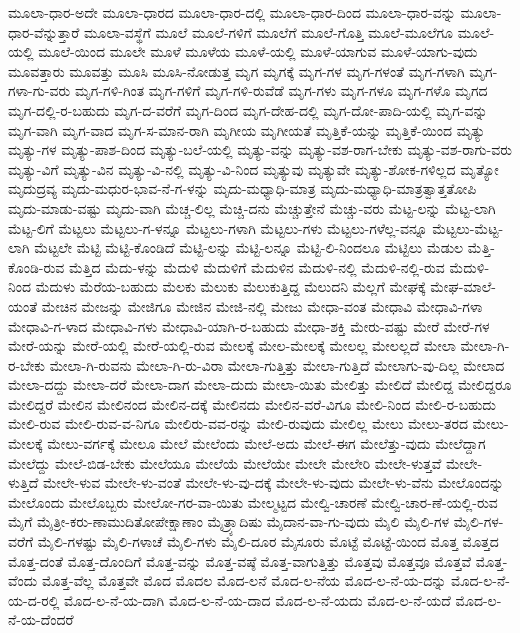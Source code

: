 {ಮೂಲಾ-ಧಾರ-ಅದೇ
ಮೂಲಾ-ಧಾರದ
ಮೂಲಾ-ಧಾರ-ದಲ್ಲಿ
ಮೂಲಾ-ಧಾರ-ದಿಂದ
ಮೂಲಾ-ಧಾರ-ವನ್ನು
ಮೂಲಾ-ಧಾರ-ವೆನ್ನುತ್ತಾರೆ
ಮೂಲಾ-ವಸ್ಥೆಗೆ
ಮೂಲೆ
ಮೂಲೆ-ಗಳಿಗೆ
ಮೂಲೆಗೆ
ಮೂಲೆ-ಗೊತ್ತಿ
ಮೂಲೆ-ಮೂಲೆಗೂ
ಮೂಲೆ-ಯಲ್ಲಿ
ಮೂಲೆ-ಯಿಂದ
ಮೂಲೇ
ಮೂಳೆ
ಮೂಳೆಯ
ಮೂಳೆ-ಯಲ್ಲಿ
ಮೂಳೆ-ಯಾಗುವ
ಮೂಳೆ-ಯಾಗು-ವುದು
ಮೂವತ್ತಾರು
ಮೂವತ್ತು
ಮೂಸಿ
ಮೂಸಿ-ನೋಡುತ್ತ
ಮೃಗ
ಮೃಗಕ್ಕೆ
ಮೃಗ-ಗಳ
ಮೃಗ-ಗಳಂತೆ
ಮೃಗ-ಗಳಾಗಿ
ಮೃಗ-ಗಳಾ-ಗು-ವರು
ಮೃಗ-ಗಳಿ-ಗಿಂತ
ಮೃಗ-ಗಳಿಗೆ
ಮೃಗ-ಗಳಿ-ರುವೆಡೆ
ಮೃಗ-ಗಳು
ಮೃಗ-ಗಳೂ
ಮೃಗ-ಗಳೊ
ಮೃಗದ
ಮೃಗ-ದಲ್ಲಿ-ರ-ಬಹುದು
ಮೃಗ-ದ-ವರೆಗೆ
ಮೃಗ-ದಿಂದ
ಮೃಗ-ದೇಹ-ದಲ್ಲಿ
ಮೃಗ-ದೋ-ಪಾದಿ-ಯಲ್ಲಿ
ಮೃಗ-ವನ್ನು
ಮೃಗ-ವಾಗಿ
ಮೃಗ-ವಾದ
ಮೃಗ-ಸ-ಮಾನ-ರಾಗಿ
ಮೃಗೀಯ
ಮೃಗೀಯತೆ
ಮೃತ್ತಿಕೆ-ಯನ್ನು
ಮೃತ್ತಿಕೆ-ಯಿಂದ
ಮೃತ್ಯು
ಮೃತ್ಯು-ಗಳ
ಮೃತ್ಯು-ಪಾಶ-ದಿಂದ
ಮೃತ್ಯು-ಬಲೆ-ಯಲ್ಲಿ
ಮೃತ್ಯು-ವನ್ನು
ಮೃತ್ಯು-ವಶ-ರಾಗ-ಬೇಕು
ಮೃತ್ಯು-ವಶ-ರಾಗು-ವರು
ಮೃತ್ಯು-ವಿಗೆ
ಮೃತ್ಯು-ವಿನ
ಮೃತ್ಯು-ವಿ-ನಲ್ಲಿ
ಮೃತ್ಯು-ವಿ-ನಿಂದ
ಮೃತ್ಯುವು
ಮೃತ್ಯುವೇ
ಮೃತ್ಯು-ಶೋಕ-ಗಳಿಲ್ಲದ
ಮೃತ್ಯೋ
ಮೃದುದ್ರವ್ಯ
ಮೃದು-ಮಧುರ-ಭಾವ-ನೆ-ಗ-ಳನ್ನು
ಮೃದು-ಮಧ್ಯಾಧಿ-ಮಾತ್ರ
ಮೃದು-ಮಧ್ಯಾಧಿ-ಮಾತ್ರತ್ವಾತ್ತತೋಪಿ
ಮೃದು-ಮಾಡು-ವಷ್ಟು
ಮೃದು-ವಾಗಿ
ಮೆಚ್ಚ-ಲಿಲ್ಲ
ಮೆಚ್ಚಿ-ದನು
ಮೆಚ್ಚುತ್ತೇನೆ
ಮೆಚ್ಚು-ವರು
ಮೆಟ್ಟ-ಲನ್ನು
ಮೆಟ್ಟ-ಲಾಗಿ
ಮೆಟ್ಟ-ಲಿಗೆ
ಮೆಟ್ಟಲು
ಮೆಟ್ಟಲು-ಗ-ಳನ್ನೂ
ಮೆಟ್ಟಲು-ಗಳಾಗಿ
ಮೆಟ್ಟಲು-ಗಳು
ಮೆಟ್ಟಲು-ಗಳೆಲ್ಲ-ವನ್ನೂ
ಮೆಟ್ಟಲು-ಮೆಟ್ಟ-ಲಾಗಿ
ಮೆಟ್ಟಲೇ
ಮೆಟ್ಟಿ
ಮೆಟ್ಟಿ-ಕೊಂಡಿದೆ
ಮೆಟ್ಟಿ-ಲನ್ನು
ಮೆಟ್ಟಿ-ಲನ್ನೂ
ಮೆಟ್ಟಿ-ಲಿ-ನಿಂದಲೂ
ಮೆಟ್ಟಿಲು
ಮೆಡುಲ
ಮೆತ್ತಿ-ಕೊಂಡಿ-ರುವ
ಮೆತ್ತಿದ
ಮೆದು-ಳನ್ನು
ಮೆದುಳಿ
ಮೆದುಳಿಗೆ
ಮೆದುಳಿನ
ಮೆದುಳಿ-ನಲ್ಲಿ
ಮೆದುಳಿ-ನಲ್ಲಿ-ರುವ
ಮೆದುಳಿ-ನಿಂದ
ಮೆದುಳು
ಮೆರೆಯ-ಬಹುದು
ಮೆಲಕು
ಮೆಲುಕು
ಮೆಲುಕುತ್ತಿದ್ದ
ಮೆಲುದನಿ
ಮೆಲ್ಲಗೆ
ಮೇಘಕ್ಕೆ
ಮೇಘ-ಮಾಲೆ-ಯಂತೆ
ಮೇಚಿನ
ಮೇಜನ್ನು
ಮೇಜಿಗೂ
ಮೇಜಿನ
ಮೇಜಿ-ನಲ್ಲಿ
ಮೇಜು
ಮೇಧಾ-ವಂತ
ಮೇಧಾವಿ
ಮೇಧಾವಿ-ಗಳಾ
ಮೇಧಾವಿ-ಗ-ಳಾದ
ಮೇಧಾವಿ-ಗಳು
ಮೇಧಾವಿ-ಯಾಗಿ-ರ-ಬಹುದು
ಮೇಧಾ-ಶಕ್ತಿ
ಮೇರು-ವಷ್ಟು
ಮೇರೆ
ಮೇರೆ-ಗಳ
ಮೇರೆ-ಯನ್ನು
ಮೇರೆ-ಯಲ್ಲಿ
ಮೇರೆ-ಯಲ್ಲಿ-ರುವ
ಮೇಲಕ್ಕೆ
ಮೇಲ-ಮೇಲಕ್ಕೆ
ಮೇಲಲ್ಲ
ಮೇಲಲ್ಲದೆ
ಮೇಲಾ
ಮೇಲಾ-ಗಿ-ರ-ಬೇಕು
ಮೇಲಾ-ಗಿ-ರುವನು
ಮೇಲಾ-ಗಿ-ರು-ವಿರಾ
ಮೇಲಾ-ಗುತ್ತಿತ್ತು
ಮೇಲಾ-ಗುತ್ತಿದೆ
ಮೇಲಾಗು-ವು-ದಿಲ್ಲ
ಮೇಲಾದ
ಮೇಲಾ-ದದ್ದು
ಮೇಲಾ-ದರೆ
ಮೇಲಾ-ದಾಗ
ಮೇಲಾ-ದುದು
ಮೇಲಾ-ಯಿತು
ಮೇಲಿತ್ತು
ಮೇಲಿದೆ
ಮೇಲಿದ್ದ
ಮೇಲಿದ್ದರೂ
ಮೇಲಿದ್ದರೆ
ಮೇಲಿನ
ಮೇಲಿನಂದ
ಮೇಲಿನ-ದಕ್ಕೆ
ಮೇಲಿನದು
ಮೇಲಿನ-ವರೆ-ವಿಗೂ
ಮೇಲಿ-ನಿಂದ
ಮೇಲಿ-ರ-ಬಹುದು
ಮೇಲಿ-ರುವ
ಮೇಲಿ-ರುವ-ವ-ನಿಗೂ
ಮೇಲಿರು-ವವ-ರನ್ನು
ಮೇಲಿ-ರುವುದು
ಮೇಲಿಲ್ಲ
ಮೇಲು
ಮೇಲು-ತರದ
ಮೇಲು-ಮೇಲಕ್ಕೆ
ಮೇಲು-ವರ್ಗಕ್ಕೆ
ಮೇಲೂ
ಮೇಲೆ
ಮೇಲೆಂದು
ಮೇಲೆ-ಅದು
ಮೇಲೆ-ಈಗ
ಮೇಲೆತ್ತು-ವುದು
ಮೇಲೆದ್ದಾಗ
ಮೇಲೆದ್ದು
ಮೇಲೆ-ಬಿಡ-ಬೇಕು
ಮೇಲೆಯೂ
ಮೇಲೆಯೆ
ಮೇಲೆಯೇ
ಮೇಲೇ
ಮೇಲೇರಿ
ಮೇಲೇ-ಳುತ್ತವೆ
ಮೇಲೇ-ಳುತ್ತಿದೆ
ಮೇಲೇ-ಳುವ
ಮೇಲೇ-ಳು-ವಂತೆ
ಮೇಲೇ-ಳು-ವು-ದಕ್ಕೆ
ಮೇಲೇ-ಳು-ವುದು
ಮೇಲೇ-ಳು-ವೆನು
ಮೇಲೊಂದನ್ನು
ಮೇಲೊಂದು
ಮೇಲೊಬ್ಬರು
ಮೇಲೋ-ಗರ-ವಾ-ಯಿತು
ಮೇಲ್ಮಟ್ಟದ
ಮೇಲ್ವಿ-ಚಾರಣೆ
ಮೇಲ್ವಿ-ಚಾರ-ಣೆ-ಯಲ್ಲಿ-ರುವ
ಮೈಗೆ
ಮೈತ್ರೀ-ಕರು-ಣಾಮುದಿತೋಪೇಕ್ಷಾಣಾಂ
ಮೈತ್ರ್ಯಾದಿಷು
ಮೈದಾನ-ವಾ-ಗು-ವುದು
ಮೈಲಿ
ಮೈಲಿ-ಗಳ
ಮೈಲಿ-ಗಳ-ವರೆಗೆ
ಮೈಲಿ-ಗಳಷ್ಟು
ಮೈಲಿ-ಗಳಾಚೆ
ಮೈಲಿ-ಗಳು
ಮೈಲಿ-ದೂರ
ಮೈಸೂರು
ಮೊಟ್ಟೆ
ಮೊಟ್ಟೆ-ಯಿಂದ
ಮೊತ್ತ
ಮೊತ್ತದ
ಮೊತ್ತ-ದಂತೆ
ಮೊತ್ತ-ದೊಂದಿಗೆ
ಮೊತ್ತ-ವನ್ನು
ಮೊತ್ತ-ವಷ್ಠೆ
ಮೊತ್ತ-ವಾಗುತ್ತಿತ್ತು
ಮೊತ್ತವು
ಮೊತ್ತವೂ
ಮೊತ್ತವೆ
ಮೊತ್ತ-ವೆಂದು
ಮೊತ್ತ-ವೆಲ್ಲ
ಮೊತ್ತವೇ
ಮೊದ
ಮೊದಲ
ಮೊದ-ಲನೆ
ಮೊದ-ಲ-ನೆಯ
ಮೊದ-ಲ-ನೆ-ಯ-ದನ್ನು
ಮೊದ-ಲ-ನೆ-ಯ-ದ-ರಲ್ಲಿ
ಮೊದ-ಲ-ನೆ-ಯ-ದಾಗಿ
ಮೊದ-ಲ-ನೆ-ಯ-ದಾದ
ಮೊದ-ಲ-ನೆ-ಯದು
ಮೊದ-ಲ-ನೆ-ಯದೆ
ಮೊದ-ಲ-ನೆ-ಯ-ದೆಂದರೆ
}
